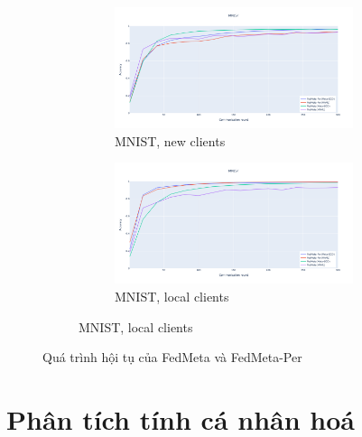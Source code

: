 \begin{figure}
    \begin{subfigure}{\textwidth}
        \centering
        \begin{subfigure}{.5\textwidth}
            \centering
            \includegraphics[width=\linewidth]{./tab_img/mnist_meta_new.png}
            \caption{MNIST, new clients}
            \label{fig:mnist_fedmetaper_new}
        \end{subfigure}%
        \begin{subfigure}{.5\textwidth}
            \centering
            \includegraphics[width=\linewidth]{./tab_img/mnist_meta_old.png}
            \caption{MNIST, local clients}
            \label{fig:mnist_fedmetaper_old}
        \end{subfigure}
    \end{subfigure}
    \caption{Quá trình hội tụ của FedMeta và FedMeta-Per}
    \label{fig:fedmetaper_acc}
\end{figure}

\section{Phân tích tính cá nhân hoá}


